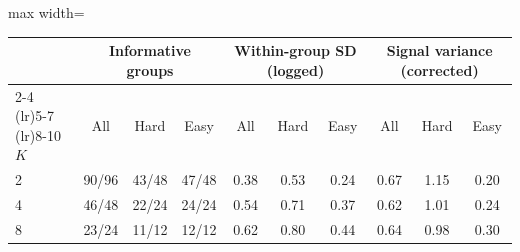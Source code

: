 \begin{adjustbox}{max width=\linewidth}
\begin{tabular}{lccccccccc}
\toprule
 & \multicolumn{3}{c}{Informative groups} & \multicolumn{3}{c}{Within-group SD (logged)} & \multicolumn{3}{c}{Signal variance (corrected)} \\
\cmidrule(lr){2-4} \cmidrule(lr){5-7} \cmidrule(lr){8-10}
$K$ & All & Hard & Easy & All & Hard & Easy & All & Hard & Easy \\
\midrule
2 & 90/96 & 43/48 & 47/48 & 0.38 & 0.53 & 0.24 & 0.67 & 1.15 & 0.20 \\
4 & 46/48 & 22/24 & 24/24 & 0.54 & 0.71 & 0.37 & 0.62 & 1.01 & 0.24 \\
8 & 23/24 & 11/12 & 12/12 & 0.62 & 0.80 & 0.44 & 0.64 & 0.98 & 0.30 \\
\bottomrule
\end{tabular}
\end{adjustbox}
